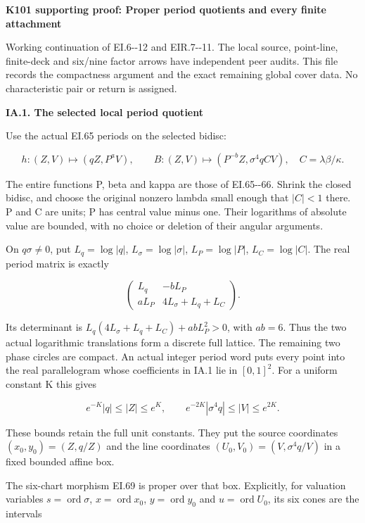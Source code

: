 \par\bigskip\noindent\textbf{K101 supporting proof: Proper period quotients and every finite attachment}\par\nobreak
Working continuation of EI.6-\/-12 and EIR.7-\/-11. The local source,
point-line, finite-deck and six/nine factor arrows have independent
peer audits. This file records the compactness argument and the exact
remaining global cover data. No characteristic pair or return is assigned.

\par

\medskip\noindent\textbf{IA.1. The selected local period quotient}

\par\nobreak

Use the actual EI.65 periods on the selected bidisc:

\[
h:(Z,V)\mapsto(qZ,P^aV),\qquad
B:(Z,V)\mapsto(P^{-b}Z,\sigma^4q C V),
\quad C=\lambda\beta/\kappa.
\]

The entire functions P, beta and kappa are those of EI.65-\/-66.
Shrink the closed bidisc, and choose the original nonzero lambda
small enough that \(|C|<1\) there. P and C are units; P has
central value minus one. Their logarithms of absolute value are
bounded, with no choice or deletion of their angular arguments.

On \(q\sigma\ne0\), put \(L_q=\log|q|\),
\(L_\sigma=\log|\sigma|\), \(L_P=\log|P|\),
\(L_C=\log|C|\). The real period matrix is exactly

\[
\begin{pmatrix}
L_q&-bL_P\\aL_P&4L_\sigma+L_q+L_C
\end{pmatrix}.
\tag{IA.1}
\]

Its determinant is
\(L_q(4L_\sigma+L_q+L_C)+abL_P^2>0\), with \(ab=6\).
Thus the two actual logarithmic translations form a discrete full
lattice. The remaining two phase circles are compact. An actual
integer period word puts every point into the real parallelogram
whose coefficients in IA.1 lie in \([0,1]^2\). For a uniform
constant K this gives

\[
e^{-K}|q|\le |Z|\le e^K,\qquad
e^{-2K}|\sigma^4q|\le |V|\le e^{2K}.
\tag{IA.2}
\]

These bounds retain the full unit constants. They put the source
coordinates \((x_0,y_0)=(Z,q/Z)\) and the line coordinates
\((U_0,V_0)=(V,\sigma^4q/V)\) in a fixed bounded affine box.

The six-chart morphism EI.69 is proper over that box. Explicitly,
for valuation variables \(s=\operatorname{ord}\sigma\),
\(x=\operatorname{ord}x_0\), \(y=\operatorname{ord}y_0\)
and \(u=\operatorname{ord}U_0\), its six cones are the intervals

